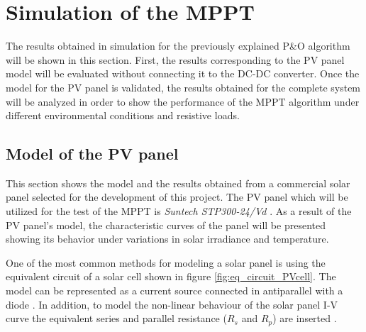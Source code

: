 
\section{Simulation of the MPPT} \label{MPPTSimulation}

The results obtained in simulation for the previously explained P\&O algorithm will be shown in this section. First, the results corresponding to the PV panel model will be evaluated without connecting it to the DC-DC converter. Once the model for the PV panel is validated, the results obtained for the complete system will be analyzed in order to show the performance of the MPPT algorithm under different environmental conditions and resistive loads.  

\subsection{Model of the PV panel}

This section shows the model and the results obtained from a commercial solar panel selected for the development of this project. The PV panel which will be utilized for the test of the MPPT is \textit{Suntech STP300-24/Vd} \cite{PV_panel}. As a result of the PV panel's model, the characteristic curves of the panel will be presented showing its behavior under variations in solar irradiance and temperature.

One of the most common methods for modeling a solar panel is using the equivalent circuit of a solar cell shown in figure \ref{fig:eq_circuit_PVcell}. The model can be represented as a current source connected in antiparallel with a diode \cite{MPPTResearch}. In addition, to model the non-linear behaviour of the solar panel I-V curve the equivalent series and parallel resistance ($R_{s}$ and $R_{p}$) are inserted \cite{MPPTResearch}.


